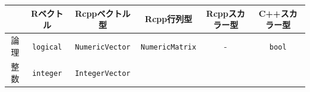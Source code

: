 \documentclass[]{book}
\begin{document}
\begin{longtable}[]{@{}cccccc@{}}
\toprule
\begin{minipage}[b]{0.14\columnwidth}\centering
\strut
\end{minipage} & \begin{minipage}[b]{0.14\columnwidth}\centering
Rベクトル\strut
\end{minipage} & \begin{minipage}[b]{0.14\columnwidth}\centering
Rcppベクトル型\strut
\end{minipage} & \begin{minipage}[b]{0.14\columnwidth}\centering
Rcpp行列型\strut
\end{minipage} & \begin{minipage}[b]{0.14\columnwidth}\centering
Rcppスカラー型\strut
\end{minipage} & \begin{minipage}[b]{0.14\columnwidth}\centering
C++スカラー型\strut
\end{minipage}\tabularnewline
\midrule
\endhead
\begin{minipage}[t]{0.14\columnwidth}\centering
論理\strut
\end{minipage} & \begin{minipage}[t]{0.14\columnwidth}\centering
\texttt{logical}\strut
\end{minipage} & \begin{minipage}[t]{0.14\columnwidth}\centering
\texttt{NumericVector}\strut
\end{minipage} & \begin{minipage}[t]{0.14\columnwidth}\centering
\texttt{NumericMatrix}\strut
\end{minipage} & \begin{minipage}[t]{0.14\columnwidth}\centering
-\strut
\end{minipage} & \begin{minipage}[t]{0.14\columnwidth}\centering
\texttt{bool}\strut
\end{minipage}\tabularnewline
\begin{minipage}[t]{0.14\columnwidth}\centering
整数\strut
\end{minipage} & \begin{minipage}[t]{0.14\columnwidth}\centering
\texttt{integer}\strut
\end{minipage} & \begin{minipage}[t]{0.14\columnwidth}\centering
\texttt{IntegerVector}\strut
\end{minipage} & \begin{minipage}[t]{0.14\columnwidth}\centering

\end{minipage}
\end{longtable}
\end{document}
